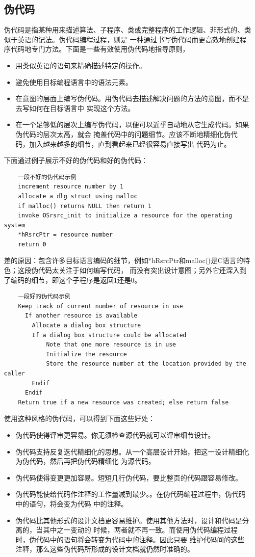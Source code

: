 \documentclass{article}
\begin{document}
\subsection{伪代码}
伪代码是指某种用来描述算法、子程序、类或完整程序的工作逻辑、非形式的、类似于英语的记法。伪代码编程过程，则是
一种通过书写伪代码而更高效地创建程序代码地专门方法。下面是一些有效使用伪代码地指导原则，
\begin{itemize}
    \item 用类似英语的语句来精确描述特定的操作。
    \item 避免使用目标编程语言中的语法元素。
    \item 在意图的层面上编写伪代码。用伪代码去描述解决问题的方法的意图，而不是去写如何在目标语言中
    实现这个方法。
    \item 在一个足够低的层次上编写伪代码，以便可以近乎自动地从它生成代码。如果伪代码的层次太高，就会
    掩盖代码中的问题细节。应该不断地精细化伪代码，加入越来越多的细节，直到看起来已经很容易直接写出
    代码为止。
\end{itemize}
下面通过例子展示不好的伪代码和好的伪代码：
\begin{lstlisting}
    一段不好的伪代码示例
    increment resource number by 1
    allocate a dlg struct using malloc
    if malloc() returns NULL then return 1
    invoke OSrsrc_init to initialize a resource for the operating system
    *hRsrcPtr = resource number
    return 0
\end{lstlisting}
差的原因：包含许多目标语言编码的细节，例如*hRsrcPtr和malloc()是C语言的特色；这段伪代码太关注于如何编写代码，
而没有突出设计意图；另外它还深入到了编码的细节，即这个子程序是返回1还是0。
\begin{lstlisting}
    一段好的伪代码示例
    Keep track of current number of resource in use
      If another resource is available
        Allocate a dialog box structure
        If a dialog box structure could be allocated
            Note that one more resource is in use
            Initialize the resource
            Store the resource number at the location provided by the caller
        Endif
      Endif
    Return true if a new resource was created; else return false
\end{lstlisting}
使用这种风格的伪代码，可以得到下面这些好处：
\begin{itemize}
    \item 伪代码使得评审更容易。你无须检查源代码就可以评审细节设计。
    \item 伪代码支持反复迭代精细化的思想。从一个高层设计开始，把这一设计精细化为伪代码，然后再把伪代码精细化
    为源代码。
    \item 伪代码使得变更更加容易。短短几行伪代码，要比整页的代码跟容易修改。
    \item 伪代码能使给代码作注释的工作量减到最少。。在伪代码编程过程中，伪代码中的语句，将会变为代码
    中的注释。
    \item 伪代码比其他形式的设计文档更容易维护。使用其他方法时，设计和代码是分离的，当其中之一变动的
    时候，两者就不再一致。而使用伪代码编程过程时，伪代码中的语句将会转变为代码中的注释。因此只要
    维护代码间的这些注释，那么这些伪代码所形成的设计文档就仍然时准确的。
\end{itemize}
\end{document}
